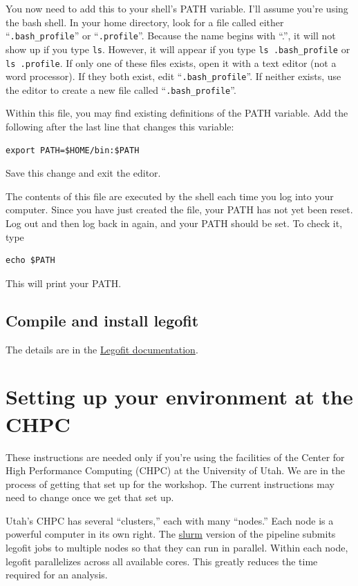 \documentclass[11pt]{article}
\begin{document}
You now need to add this to your shell's PATH variable. I'll assume
you're using the bash shell. In your home directory, look for a file
called either ``\verb|.bash_profile|'' or
``\texttt{.profile}''. Because the name begins with ``.'', it will not
show up if you type \texttt{ls}. However, it will appear if you type
\verb|ls .bash_profile| or \verb|ls .profile|. If only one of these
files exists, open it with a text editor (not a word processor). If
they both exist, edit ``\verb|.bash_profile|''. If neither exists, use
the editor to create a new file called ``\verb|.bash_profile|''.

Within this file, you may find existing definitions of the PATH
variable. Add the following after the last line that changes this
variable:
\begin{verbatim}
export PATH=$HOME/bin:$PATH
\end{verbatim}
Save this change and exit the editor.

The contents of this file are executed by the shell each time you log
into your computer. Since you have just created the file, your PATH
has not yet been reset. Log out and then log back in again, and your
PATH should be set. To check it, type
\begin{verbatim}
echo $PATH
\end{verbatim}
This will print your PATH.

\subsection{Compile and install legofit}
The details are in the
\href{http://alanrogers.github.io/legofit/html/index.html}{Legofit
  documentation}.

\section{Setting up your environment at the CHPC}
\label{sec.chpc}
These instructions are needed only if you're using the facilities of
the Center for High Performance Computing (CHPC) at the University of
Utah. We are in the process of getting that set up for the
workshop. The current instructions may need to change once we get that
set up.

Utah's CHPC has several ``clusters,'' each with many ``nodes.''  Each
node is a powerful computer in its own right. The
\href{https://slurm.schedmd.com/documentation.html}{slurm} version of
the pipeline submits legofit jobs to multiple nodes so that they can
run in parallel. Within each node, legofit parallelizes across all
available cores. This greatly reduces the time required for an
analysis.
\end{document}
